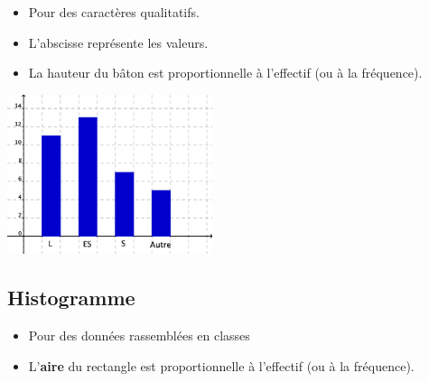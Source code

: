 \begin{multicols}{2}
\begin{itemize}
\item Pour des caractères qualitatifs.
\item L'abscisse représente les valeurs.
\item La hauteur du bâton est proportionnelle à l'effectif (ou à la fréquence).
\end{itemize}

\medskip
{}
\columnbreak
  \begin{center}
    \includegraphics[width=6cm]{Stats_Fig4_DiagBaton}
  \end{center}    
\end{multicols}




\subsection{Histogramme}

\begin{itemize}
\item Pour des données rassemblées en classes
\item L'\textbf{aire} du rectangle est proportionnelle à l'effectif (ou à la
fréquence). 
\end{itemize}

